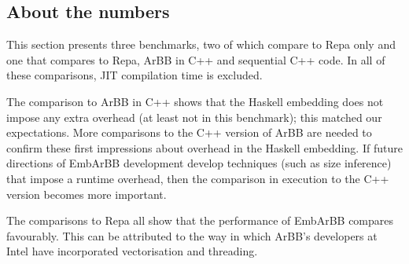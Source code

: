 \subsection{About the numbers} 
This section presents three benchmarks, two of which compare to Repa only and 
one that compares to Repa, ArBB in C++ and sequential C++ code. In all of these comparisons,
JIT compilation time is excluded.

The comparison to ArBB in C++ shows that the Haskell embedding does not impose any 
extra overhead (at least not in this benchmark); this matched our expectations. More comparisons to the C++ version of ArBB are needed to confirm these first impressions about overhead in the Haskell embedding. If future directions of EmbArBB development develop techniques (such as size inference) that impose a runtime overhead, then the 
comparison in execution to the C++ version becomes more important. 

The comparisons to Repa all show that the performance of EmbArBB compares favourably. This can be attributed to the way in which ArBB's developers at Intel have incorporated vectorisation and threading. 
 








 




 

